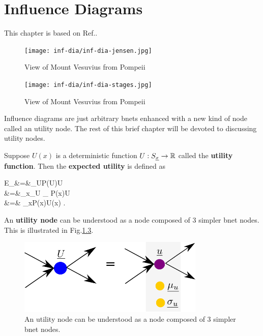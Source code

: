 \chapter{Influence Diagrams}
\label{ch-inf-dia}

This chapter is based on Ref.\cite{sha-inf-dia}.


\begin{figure}[h!]
\centering
\texttt{[image: inf-dia/inf-dia-jensen.jpg]}
\caption{View of Mount Vesuvius from
  Pompeii}
\label{fig-jensen-diag}
\end{figure}

\begin{figure}[h!]
\centering
\texttt{[image: inf-dia/inf-dia-stages.jpg]}
\caption{View of Mount Vesuvius from
  Pompeii}
\label{fig-jensen-stages}
\end{figure}

























Influence diagrams are
just arbitrary bnets
enhanced with a 
new kind of node called an utility node.
The rest
of this brief chapter  will 
be devoted to discussing utility nodes.

Suppose $U(x)$ is a deterministic 
function $U:S_{\underline{x}}\rightarrow { \mathbb{R}}$
called the {\bf utility function}.
Then the {\bf expected utility}
is defined as


\beqa
E_\rvU[\rvU]&=&\sum_UP(U)U
\\
&=&\sum_x\sum_U
_
{\delta[U, U(x)]}P(x)U
\\
&=&
\sum_xP(x)U(x)
\;.
\eeqa

An {\bf utility node}
can be
understood
as a node
composed of 3 simpler bnet nodes.
This
is illustrated in Fig.\ref{fig-util-node}.

\begin{figure}[h!]
\centering
\includegraphics[width=3.5in]
{inf-dia/util-node.png}
\caption{An utility node
can be
understood
as a node 
composed of 3 simpler bnet nodes.} 
\label{fig-util-node}
\end{figure}

